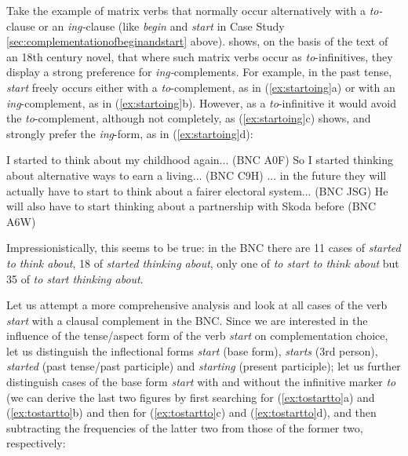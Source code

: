 Take the example of matrix verbs  that normally occur alternatively with a \textit{to-}clause or an \textit{ing-}clause (like \textit{begin} and \textit{start} in Case Study \ref{sec:complementationofbeginandstart} above). \citet[380]{rohdenburg_replacement_1995} shows, on the basis of the text of an 18th century novel,  that where such matrix verbs occur as \textit{to}-infinitives, they display a strong preference for \textit{ing-}complements.  For example, in the past tense, \textit{start} freely occurs either with a \textit{to}-complement, as in (\ref{ex:startoing}a) or with an \textit{ing}-complement, as in (\ref{ex:startoing}b). However, as a \textit{to}-infinitive it would avoid the \textit{to}-complement, although not completely, as (\ref{ex:startoing}c) shows, and strongly prefer the \textit{ing}-form, as in (\ref{ex:startoing}d):

\begin{exe}
\ex
\begin{xlist}
\label{ex:startoing}
\ex I started to think about my childhood again... (BNC A0F)
\ex So I started thinking about alternative ways to earn a living... (BNC C9H)
\ex ... in the future they will actually have to start to think about a fairer electoral system... (BNC JSG)
\ex He will also have to start thinking about a partnership with Skoda before (BNC A6W)
\end{xlist}
\end{exe}

Impressionistically, this seems to be true: in the BNC  there are 11 cases of \textit{started to think about}, 18 of \textit{started thinking about}, only one of \textit{to start to think about} but 35 of \textit{to start thinking about}.

Let us attempt a more comprehensive analysis and look at all cases of the verb  \textit{start} with a clausal complement  in the BNC.  Since we are interested in the influence of the tense\slash aspect form of the verb \textit{start} on complementation choice, let us distinguish the inflectional forms \textit{start} (base form), \textit{starts} (3rd person), \textit{started} (past tense\slash past participle) and \textit{starting} (present participle); let us further distinguish cases of the base form \textit{start} with and without the infinitive marker \textit{to} (we can derive the last two figures by first searching for (\ref{ex:tostartto}a) and (\ref{ex:tostartto}b) and then for (\ref{ex:tostartto}c) and (\ref{ex:tostartto}d), and then subtracting the frequencies  of the latter two from those of the former two, respectively:

